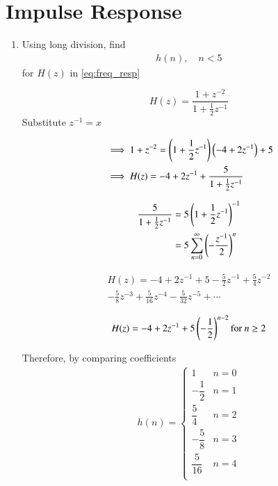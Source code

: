 \documentclass[journal,12pt,twocolumn]{IEEEtran}
\renewcommand\thesection{\arabic{section}}
\begin{document}
\section{Impulse Response}

\begin{enumerate}[label=\thesection.\arabic*
,ref=\thesection.\theenumi]
\item Using long division, find
\begin{align}
	h(n), \quad n < 5
\end{align}
for $H(z)$ in \eqref{eq:freq_resp}

\solution 
\begin{equation}
	H(z) = \frac{1 + z^{-2}}{1 + \frac12 z^{-1}}
\end{equation}
Substitute $z^{-1} = x$


\begin{align}
	&\implies 1 + z^{-2} = \left(1 + \frac12 z^{-1}\right)\left(-4 + 2z^{-1}\right) + 5 \\
	&\implies H(z) = -4 + 2z^{-1} + \frac{5}{1 + \frac12 z^{-1}}
\end{align}

\begin{align}
	\frac{5}{1 + \frac12 z^{-1}} &= 5 \left(1 + \frac12 z^{-1}\right)^{-1} \\
	&= 5 \sum_{n=0}^\infty \left(-\frac{z^{-1}}{2}\right)^n
\end{align}

\begin{multline}
	H(z) = -4 + 2z^{-1} + 5 - \frac{5}{2}z^{-1} + \frac{5}{4}z^{-2}\\ - \frac{5}{8}z^{-3}  + \frac{5}{16}z^{-4} - \frac{5}{32}z^{-5} + \cdots
\end{multline}

\begin{align}
	H(z) = -4 + 2z^{-1}+5\left(-\frac{1}{2}\right)^{n-2}  \text{for $n\ge2$} 
\end{align}

Therefore, by comparing coefficients
\begin{align}
	h(n) = 
	\begin{cases}
		1 & n = 0 \\
		-\dfrac12 & n = 1 \\
		\dfrac{5}{4} & n = 2 \\
		-\dfrac{5}{8} & n = 3 \\
		\dfrac{5}{16} & n = 4 \\
	\end{cases}
\end{align}


\end{enumerate}
\end{document}
